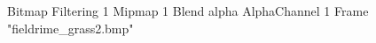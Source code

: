 {Bitmap
	{Filtering 1}
	{Mipmap 1}
	{Blend alpha}
	{AlphaChannel 1}
	{Frame "fieldrime_grass2.bmp"}
}
